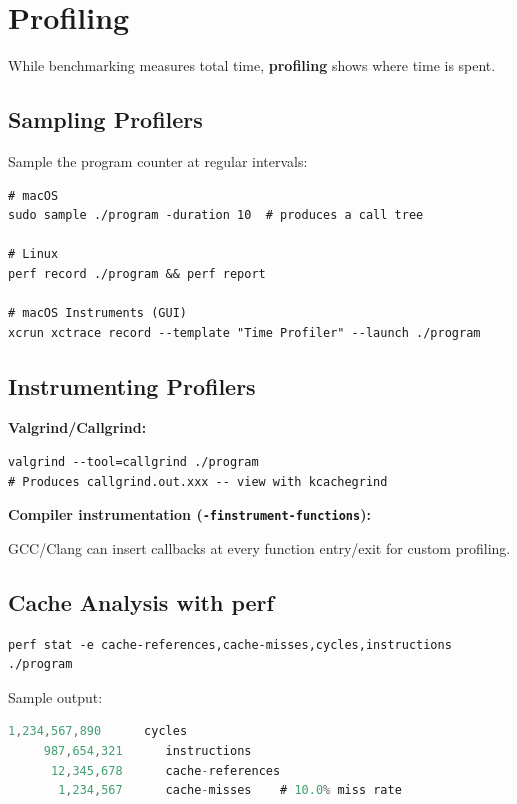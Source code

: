 \section{Profiling}

While benchmarking measures total time, \textbf{profiling} shows where time is spent.

\subsection{Sampling Profilers}

Sample the program counter at regular intervals:

\begin{lstlisting}
# macOS
sudo sample ./program -duration 10  # produces a call tree

# Linux
perf record ./program && perf report

# macOS Instruments (GUI)
xcrun xctrace record --template "Time Profiler" --launch ./program
\end{lstlisting}

\subsection{Instrumenting Profilers}

\textbf{Valgrind/Callgrind:}

\begin{lstlisting}
valgrind --tool=callgrind ./program
# Produces callgrind.out.xxx -- view with kcachegrind
\end{lstlisting}

\textbf{Compiler instrumentation (\texttt{-finstrument-functions}):}

GCC/Clang can insert callbacks at every function entry/exit for custom profiling.

\subsection{Cache Analysis with perf}

\begin{lstlisting}
perf stat -e cache-references,cache-misses,cycles,instructions ./program
\end{lstlisting}

Sample output:
\begin{lstlisting}[language=Java]
   1,234,567,890      cycles
     987,654,321      instructions
      12,345,678      cache-references
       1,234,567      cache-misses    # 10.0% miss rate
\end{lstlisting}

